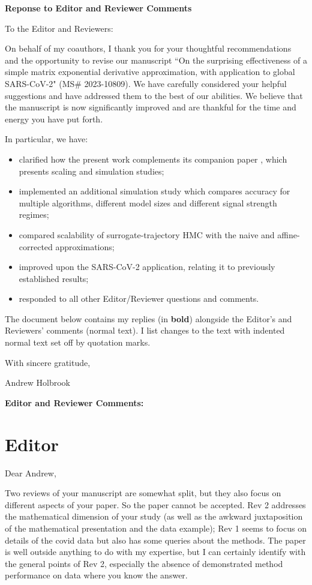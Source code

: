 \documentclass[12pt]{article}
\def\paperTitle{On the surprising effectiveness of a simple matrix exponential derivative approximation, with application to global SARS-CoV-2}
\def\paperID{MS\# 2023-10809}
\begin{document}


\centerline{\large \bf Reponse to Editor and Reviewer Comments}

To the Editor and Reviewers:

On behalf of my coauthors, I thank you for your thoughtful recommendations and the opportunity to revise our manuscript ``\paperTitle" (\paperID).
We have carefully considered your helpful suggestions and have addressed them to the best of our abilities.  We believe that the manuscript is now significantly improved and are thankful for the time and energy you have put forth.

In particular, we have:
\begin{itemize}
	\item clarified how the present work complements its companion paper \citet{magee2023random}, which presents scaling and simulation studies;
	
	\item implemented an additional simulation study which compares accuracy for multiple algorithms, different model sizes and different signal strength regimes;
	
    \item compared scalability of surrogate-trajectory HMC with the naive and affine-corrected approximations;
    
    \item improved upon the SARS-CoV-2 application, relating it to previously established results;
	
	\item responded to all other Editor/Reviewer questions and comments.
\end{itemize}


The document below contains my replies (in \textbf{bold}) alongside the Editor's and Reviewers' comments (normal text).  I list changes to the text with indented normal text set off by quotation marks.

With sincere gratitude,

Andrew Holbrook
\clearpage


{\Large \bf Editor and Reviewer Comments:}


\section*{Editor}

Dear Andrew, 

Two reviews of your manuscript are somewhat split, but they also focus on different aspects of your paper. So the paper cannot be accepted. Rev 2 addresses the mathematical dimension of your study (as well as the awkward juxtaposition of the mathematical presentation and the data example); Rev 1 seems to focus on details of the covid data but also has some queries about the methods. The paper is well outside anything to do with my expertise, but I can certainly identify with the general points of Rev 2, especially the absence of demonstrated method performance on data where you know the answer. 
\end{document}
